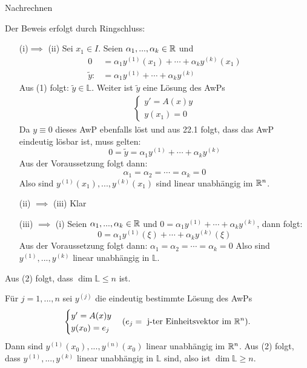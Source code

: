 \documentclass[a4paper,oneside,DIV15,BCOR12mm,chapterprefix=true,headings=onelinechapter]{scrbook}
\begin{document}
\begin{beweise}
\item Nachrechnen

\item Der Beweis erfolgt durch Ringschluss:
\begin{enumerate}
\item[(i)$\implies$ (ii)] Sei $x_1 \in I$. Seien $\alpha_1, ...,  
\alpha_k \in \mathbb{R}$ und 
\begin{align*}
0 &= \alpha_1 y^{(1)}(x_1) + \cdots + \alpha_k y^ {(k)}(x_1)\\ 
\tilde y :&= \alpha_1 y^{(1)} + \cdots + \alpha_k y^{(k)}
\end{align*}  
Aus (1) folgt: $\tilde y \in \mathbb{L}$. Weiter ist $\tilde y$ eine  
Lösung des AwPs
\begin{align*} \begin{cases}
y' = A(x) y\\
y(x_1) = 0
\end{cases} \end{align*}
Da $y \equiv 0$ dieses AwP ebenfalls löst und aus 22.1 folgt, dass das AwP  
eindeutig lösbar ist, muss gelten:
\[0 = \tilde y = \alpha_1 y^{(1)} + \cdots +  \alpha_k y^{(k)}\]
Aus der Voraussetzung folgt dann: 
\[\alpha_1 = \alpha_2 = \cdots = \alpha_k = 0\] 
Also sind $y^{(1)}(x_1), ..., y^{(k)} (x_1)$ sind linear unabhängig im $\mathbb{R}^n$.
\item[(ii) $\implies$ (iii)] Klar \checkmark
\item[(iii) $\implies$ (i)]Seien $\alpha_1, ..., \alpha_k \in \mathbb{R}$  
und $0 = \alpha_1 y^{(1)} + \cdots + \alpha_k y^{(k)}$, dann folgt:
\[0 = \alpha_1 y^{(1)}(\xi ) + \cdots + \alpha_k y^{(k)}(\xi )\] 
Aus der Voraussetzung folgt dann: $\alpha_1 = \alpha_2 = \cdots = \alpha_k = 0$  
Also sind $y^{(1)}, ..., y^{(k)}$ linear unabhängig in $\mathbb{L}$. 
\end{enumerate}

\item Aus (2) folgt, dass $\dim \mathbb{L} \le n$ ist.

Für $j = 1,..., n$ sei $y^{(j)}$ die eindeutig bestimmte Lösung des  
AwPs
\begin{align*}
\begin{cases}
y' = A(x) y\\
y(x_0) = e_j
\end{cases}
(e_j = \text{ j-ter Einheitsvektor im }\mathbb{R}^n).
\end{align*}
Dann sind $y^{(1)}(x_0), ..., y^{(n)}(x_0)$ linear unabhängig im $ 
\mathbb{R}^n$. Aus (2) folgt, dass $y^{(1)}, ..., y^{(k)}$ linear unabhängig  
in $\mathbb{L}$ sind, also ist $\dim \mathbb{L} \ge n$.
\end{beweise}
\end{document}
